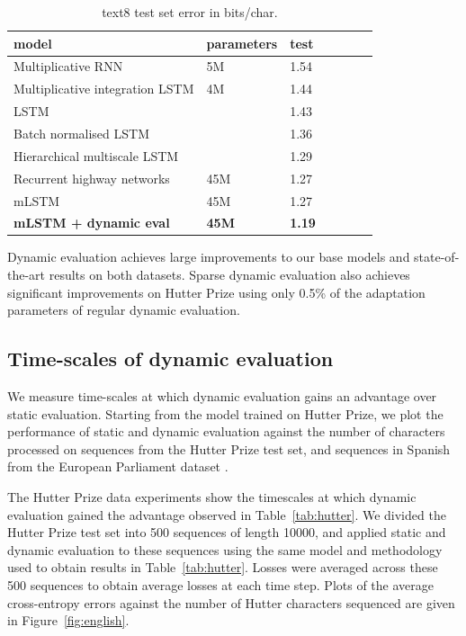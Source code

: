 \documentclass{article}
\begin{document}
\begin{table}[tb]
\begin{center} 
\begin{tabular}{  l  l  l  l  l  l  l } \toprule 
model & parameters & test  \\ 
\midrule 
Multiplicative RNN \citep{mikolov2012subword}& 5M & 1.54 \\
Multiplicative integration LSTM \citep{wu2016}& 4M & 1.44 \\
LSTM \citep{cooijmans2017}& & 1.43 \\
Batch normalised LSTM \citep{cooijmans2017}& & 1.36 \\
Hierarchical multiscale LSTM \citep{chung2017}&  & 1.29 \\
Recurrent highway networks \citep{zilly2017}& 45M & 1.27 \\
\midrule 
mLSTM \citep{krause2016} &45M& 1.27 \\
\textbf{mLSTM + dynamic eval} &\textbf{45M} & \textbf{1.19} \\
\bottomrule
\end{tabular} 
\end{center}
\caption{text8 test set error in bits/char.}
\label{tab:text8}
\end{table}
Dynamic evaluation achieves large improvements to our base models and state-of-the-art results on both datasets. Sparse dynamic evaluation also achieves significant improvements on Hutter Prize using only 0.5\% of the adaptation parameters of regular dynamic evaluation.

\subsection{Time-scales of dynamic evaluation}
\label{sec:timescales}
We measure time-scales at which dynamic evaluation gains an advantage over static evaluation. Starting from the model trained on Hutter Prize, we plot the performance of static and dynamic evaluation against the number of characters processed on sequences from the Hutter Prize test set, and sequences in Spanish from the European Parliament dataset \citep{koehn2005}.

The Hutter Prize data experiments show the timescales at which dynamic evaluation gained the advantage observed in Table~\ref{tab:hutter}. We divided the Hutter Prize test set into 500 sequences of length 10000, and applied static and dynamic evaluation to these sequences using the same model and methodology used to obtain results in Table~\ref{tab:hutter}. Losses were averaged across these 500 sequences to obtain average losses at each time step. Plots of the average cross-entropy errors against the number of Hutter characters sequenced are given in Figure~\ref{fig:english}.
\end{document}
